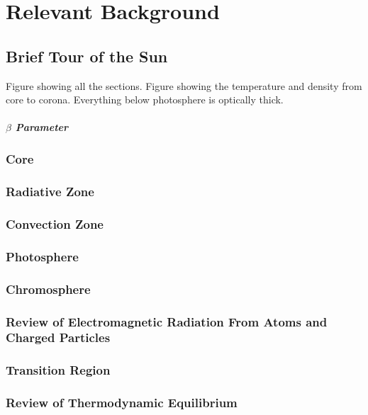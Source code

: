 \chapter{Relevant Background}
\label{chapterbackground}

\section{Brief Tour of the Sun}
Figure showing all the sections. 
Figure showing the temperature and density from core to corona. 
Everything below photosphere is optically thick. 

\paragraph{$\beta$ Parameter}

\subsection{Core}

\subsection{Radiative Zone}

\subsection{Convection Zone}

\subsection{Photosphere}

\subsection{Chromosphere}

\subsection{Review of Electromagnetic Radiation From Atoms and Charged Particles}

\subsection{Transition Region}

\subsection{Review of Thermodynamic Equilibrium} 

